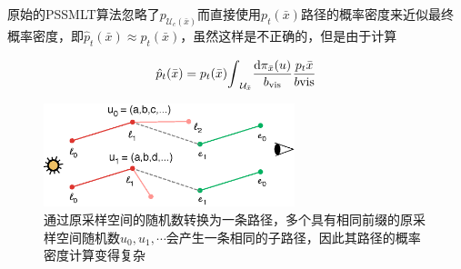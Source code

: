 原始的PSSMLT算法忽略了$p_{\mathcal{U}_c(\bar{x})}$而直接使用$p_t(\bar{x})$路径的概率密度来近似最终概率密度，即$\hat{p}_t(\bar{x})\approx p_t(\bar{x})$，虽然这样是不正确的，但是由于计算

\begin{equation}
	\hat{p}_t(\bar{x})=p_t(\bar{x}){\rm \int}_{\mathcal{U}_{\bar{x}}}\frac{{\rm d}\pi_{\bar{x}}(u)}{b_{\text{vis}}}\frac{p_t{\bar{x}}}{b\text{vis}}
\end{equation}



\begin{figure}
	\sidecaption
	\includegraphics[width=0.65\textwidth]{figures/mlt/mis-weight}
	\caption{通过原采样空间的随机数转换为一条路径，多个具有相同前缀的原采样空间随机数$u_0,u_1,\cdots$会产生一条相同的子路径，因此其路径的概率密度计算变得复杂}
	\label{f:mlt-mis-weight}
\end{figure}































